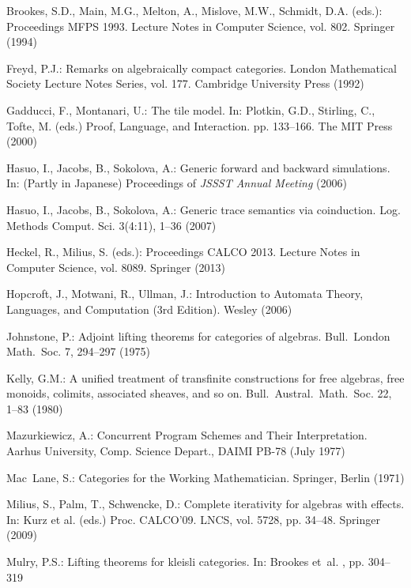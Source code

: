 \documentclass[oribibl,envcountsame,envcountsect,runningheads]{llncs}
\renewcommand{\>}{\rangle}
\begin{document}
\begin{thebibliography}{10}
Brookes, S.D., Main, M.G., Melton, A., Mislove, M.W., Schmidt, D.A. (eds.): Proceedings MFPS 1993. Lecture
  Notes in Computer Science, vol. 802. Springer (1994)

Freyd, P.J.: Remarks on algebraically compact categories. London Mathematical Society Lecture Notes
  Series, vol. 177. Cambridge University Press (1992)

Gadducci, F., Montanari, U.: The tile model. In: Plotkin, G.D., Stirling, C.,
  Tofte, M. (eds.) Proof, Language, and Interaction. pp. 133--166. The MIT
  Press (2000)

Hasuo, I., Jacobs, B., Sokolova, A.: Generic forward and backward simulations.
  In: (Partly in Japanese) Proceedings of {\em JSSST Annual Meeting} (2006)

Hasuo, I., Jacobs, B., Sokolova, A.: Generic trace semantics via coinduction.
  Log. Methods Comput. Sci.  3(4:11),  1--36 (2007)

Heckel, R., Milius, S. (eds.): Proceedings CALCO 2013. Lecture Notes in Computer Science, vol. 8089. Springer (2013)

Hopcroft, J., Motwani, R., Ullman, J.: Introduction to Automata Theory,
  Languages, and Computation (3rd Edition). Wesley (2006)

Johnstone, P.: Adjoint lifting theorems for categories of algebras.
  Bull.~London Math.~Soc.  7,  294--297 (1975)

Kelly, G.M.: A unified treatment of transfinite constructions for free
  algebras, free monoids, colimits, associated sheaves, and so on.
  Bull.~Austral.~Math.~Soc.  22,  1--83 (1980)

Mazurkiewicz, A.: Concurrent Program Schemes and Their Interpretation. Aarhus
  University, Comp. Science Depart., DAIMI PB-78 (July 1977)

\mbox{Mac Lane}, S.: Categories for the Working Mathematician. Springer, Berlin
  (1971)

Milius, S., Palm, T., Schwencke, D.: Complete iterativity for algebras with
  effects. In: Kurz et al. (eds.) Proc. CALCO'09. LNCS,
  vol. 5728, pp. 34--48. Springer (2009)

Mulry, P.S.: Lifting theorems for kleisli categories. In: Brookes et~al.
  \cite{DBLP:conf/mfps/1993}, pp. 304--319


\end{thebibliography}
\end{document}
